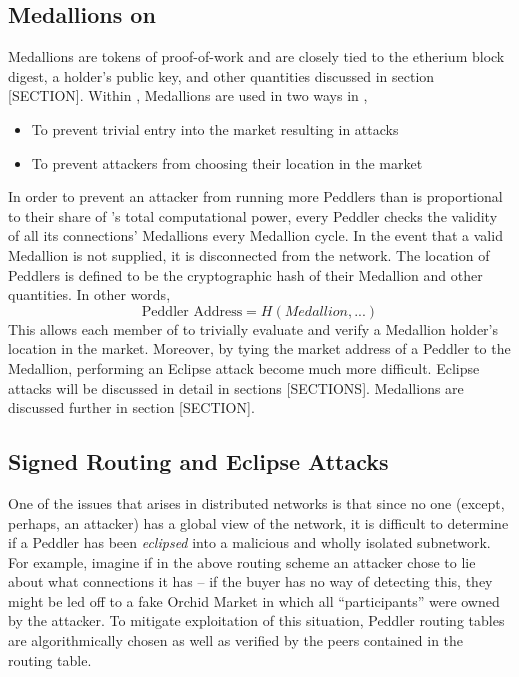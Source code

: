 \subsection{Medallions on \TOM{}}

Medallions are tokens of proof-of-work and are closely tied to the etherium block digest, a holder's public key, and other quantities discussed in section {\color{red}[SECTION]}. Within \TOM{}, Medallions are used in two ways in \TOM{},
  \begin{itemize}
      \item To prevent trivial entry into the market resulting in attacks 
      \item To prevent attackers from choosing their location in the market
  \end{itemize}
In order to prevent an attacker from running more Peddlers than is proportional to their share of \tOM{}'s total computational power, every Peddler checks the validity of all its connections' Medallions every Medallion cycle. In the event that a valid Medallion is not supplied, it is disconnected from the network. The location of Peddlers is defined to be the cryptographic hash of their Medallion {\color{red} and other quantities}. In other words, 
						$$\textrm{Peddler Address} = H(Medallion, ...)$$
This allows each member of \TOM{} to trivially evaluate and verify a Medallion holder's location in the market. Moreover, by tying the market address of a Peddler to the Medallion, performing an Eclipse attack become much more difficult. Eclipse attacks will be discussed in detail in sections {\color{red}[SECTIONS]}. Medallions are discussed further in section {\color{red}[SECTION]}.

\subsection{Signed Routing and Eclipse Attacks}

One of the issues that arises in distributed networks is that since no one (except, perhaps, an attacker) has a global view of the network, it is difficult to determine if a Peddler has been \textit{eclipsed} into a malicious and wholly isolated subnetwork. For example, imagine if in the above routing scheme an attacker chose to lie about what connections it has – if the buyer has no way of detecting this, they might be led off to a fake Orchid Market in which all “participants” were owned by the attacker. To mitigate exploitation of this situation, Peddler routing tables are algorithmically chosen as well as verified by the peers contained in the routing table.

